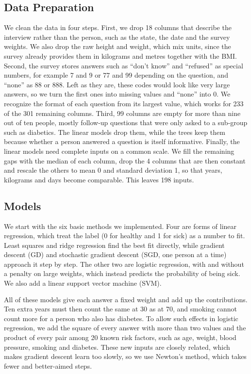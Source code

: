 \documentclass[10pt,conference,compsocconf]{IEEEtran}
\begin{document}
\subsection{Data Preparation}

We clean the data in four steps. First, we drop 18
columns that describe the interview rather than the person, such as the
state, the date and the survey weights. We also drop the raw height and
weight, which mix units, since the survey already provides them in kilograms
and metres together with the BMI. Second, the survey stores answers such as ``don't know'' and ``refused'' as
special numbers, for example 7 and 9 or 77 and 99 depending on the question,
and ``none'' as 88 or 888. Left as they are, these codes would look like very
large answers, so we turn the first ones into missing values and ``none''
into 0. We recognize the format of each question from its largest value,
which works for 233 of the 301 remaining columns. Third, 99 columns are empty for more than nine out of ten people, mostly
follow-up questions that were only asked to a sub-group such as diabetics.
The linear models drop them, while the trees keep them because whether a
person answered a question is itself informative. Finally, the linear models need complete inputs on a common scale. We fill
the remaining gaps with the median of each column, drop the 4 columns that are
then constant and rescale the others to mean 0 and standard deviation 1, so
that years, kilograms and days become comparable. This leaves 198 inputs.

\subsection{Models}

We start with the six basic methods we implemented. Four are forms of linear
regression, which treat the label (0 for healthy and 1 for
sick) as a number to fit. Least squares and ridge regression find the best
fit directly, while gradient descent (GD) and stochastic gradient descent
(SGD, one person at a time) approach it step by step.
The other two are logistic regression, with and without a penalty on
large weights, which instead predicts the probability of being sick. We also
add a linear support vector machine (SVM).

All of these models give each answer a fixed weight and add up the
contributions. Ten extra years must then count the same at 30 as at 70, and
smoking cannot count more for a person who also has diabetes. To allow such
effects in logistic regression, we add the square of every answer with more
than two values and the product of every pair among 20 known risk factors,
such as age, weight, blood pressure, smoking and diabetes. These new inputs
are closely related, which makes gradient descent learn too slowly, so we use Newton's method, which takes fewer and better-aimed steps.
\end{document}
